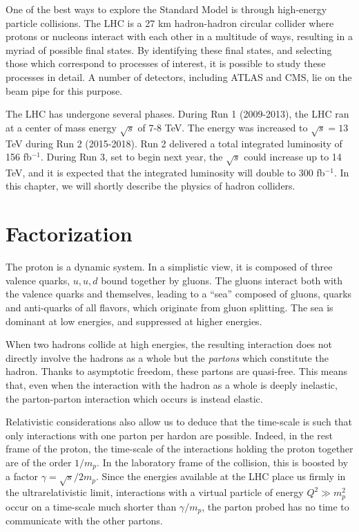 \documentclass[10pt,a4paper]{book}
\begin{document}
One of the best ways to explore the Standard Model is through high-energy particle collisions. The LHC is a 27 km hadron-hadron circular collider where protons or nucleons interact with each other in a multitude of ways, resulting in a myriad of possible final states. By identifying these final states, and selecting those which correspond to processes of interest, it is possible to study these processes in detail. A number of detectors, including ATLAS and CMS, lie on the beam pipe for this purpose.

The LHC has undergone several phases. During Run 1 (2009-2013), the LHC ran at a center of mass energy $\sqrt{s}$ of 7-8 TeV. The energy was increased to $\sqrt{s} = 13$ TeV during Run 2 (2015-2018). 
Run 2 delivered a total integrated luminosity of 156 fb$^{-1}$. During Run 3, set to begin next year, the $\sqrt{s}$ could increase up to 14 TeV, and it is expected that the integrated luminosity will double to 300 fb$^{-1}$. In this chapter, we will shortly describe the physics of hadron colliders.

\section{Factorization}

  
The proton is a dynamic system. In a simplistic view, it is composed of three valence quarks, $u, u, d$ bound together by gluons. The gluons interact both with the valence quarks and themselves, leading to a ``sea'' composed of gluons, quarks and anti-quarks of all flavors, which originate from gluon splitting. The sea is dominant at low energies, and suppressed at higher energies. 

When two hadrons collide at high energies, the resulting interaction does not directly involve the hadrons as a whole but the \emph{partons} which constitute the hadron. Thanks to asymptotic freedom, these partons are quasi-free. This means that, even when the interaction with the hadron as a whole is deeply inelastic, the parton-parton interaction which occurs is instead elastic. 

Relativistic considerations also allow us to deduce that the time-scale is such that only interactions with one parton per hardon are possible. Indeed, in the rest frame of the proton, the time-scale of the interactions holding the proton together are of the order $1/m_p$. In the laboratory frame of the collision, this is boosted by a factor $\gamma = \sqrt{s}/2m_p$. Since the energies available at the LHC place us firmly in the ultrarelativistic limit, interactions with a virtual particle of energy $Q^2 \gg m_p^2$ occur on a time-scale much shorter than $\gamma/m_p$, the parton probed has no time to communicate with the other partons.
\end{document}
